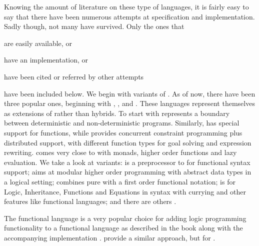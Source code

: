 \documentclass[thesis-solanki.tex]{subfiles}
\begin{document}
Knowing the amount of literature  on these type of languages, it is fairly easy to say that there have been numerous 
attempts at specification and implementation.
Sadly though, not many have survived.
Only the ones that 
\begin{inparaenum}[(a)]
\item
  are easily available, or
\item
  have an implementation, or
\item
  have been cited or referred by other attempts
\end{inparaenum}
have been included below.
We begin with variants of .
As of now, there have been three popular ones, beginning with , \cite{website:nue-prolog},
 \cite{website:oz-mozart} and  \cite{website:mercury}.
These languages represent themselves as extensions of  rather than hybrids.
To start with  represents a boundary between deterministic and non-deterministic programs.
Similarly,  has special support for functions, while  provides concurrent constraint
programming plus distributed support, with different function types for goal solving and expression rewriting.
 \cite{lloyd1999programming:escher} comes very close to  with monads, higher
order functions and lazy evaluation.
We take a look at  variants:   is a preprocessor to
 for functional syntax support; 
 aims at modular higher order programming with abstract data types in a
logical setting;   combines pure
 with a first order functional notation;   is for
Logic, Inheritance, Functions and Equations in  syntax with currying and other features like
functional languages; and there are others .

The functional language  is a very popular choice for adding logic programming functionality to a functional 
language as described in the book \cite{friedman05reasoned} along with the accompanying implementation \cite{website:kanren,website:minkanren}.
\cite{website:haskellkanren,website:molog,website:minikanrent} provide a similar 
approach, but for .
\end{document}
